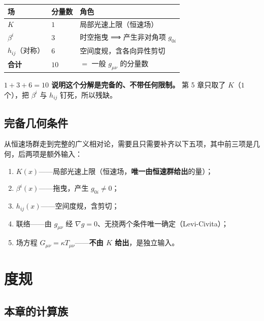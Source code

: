 \documentclass[
  chinese,
  a4paper,
  UTF8,
  12pt,
  oneside,
  openany]{ctexbook}
\newcounter{none} %
\providecommand{\tightlist}{%
  \setlength{\itemsep}{0pt}\setlength{\parskip}{0pt}}
\theoremstyle{plain}
\theoremstyle{plain}
\theoremstyle{plain}
\theoremstyle{definition}
\theoremstyle{plain}
\theoremstyle{plain}
\theoremstyle{remark}
\begin{document}
{\def\LTcaptype{none} %
\begin{longtable}[]{@{}lll@{}}
\toprule\noalign{}
场 & 分量数 & 角色 \\
\midrule\noalign{}
\endhead
\bottomrule\noalign{}
\endlastfoot
\(K\) & \(1\) & 局部光速上限（恒速场） \\
\(\beta^{i}\) & \(3\) & 时空拖曳 ⟹ 产生非对角项 \(g_{0i}\) \\
\(h_{ij}\)（对称） & \(6\) & 空间度规，含各向异性剪切 \\
\textbf{合计} & \textbf{\(10\)} & \(=\) 一般 \(g_{\mu\nu}\) 的分量数 \\
\end{longtable}
}

\textbf{\(1+3+6=10\) 说明这个分解是完备的、不带任何限制。} 第 5 章只取了
\(K\)（\(1\) 个），把 \(\beta^{i}\) 与 \(h_{ij}\) 钉死，所以残缺。

\subsection{完备几何条件}\label{ux5b8cux5907ux51e0ux4f55ux6761ux4ef6}

从恒速场群走到完整的广义相对论，需要且只需要补齐以下五项，其中前三项是几何，后两项是额外输入：

\begin{enumerate}
\def\labelenumi{\arabic{enumi}.}
\tightlist
\item
  \(K(x)\)------局部光速上限（恒速场，\textbf{唯一由恒速群给出}的量）；
\item
  \(\beta^{i}(x)\)------拖曳，产生 \(g_{0i}\neq0\)；
\item
  \(h_{ij}(x)\)------空间度规，含剪切；
\item
  联络------由 \(g_{\mu\nu}\) 经
  \(\nabla g=0\)、无挠两个条件唯一确定（Levi-Civita）；
\item
  场方程 \(G_{\mu\nu}=\kappa T_{\mu\nu}\)------\textbf{不由 \(K\)
  给出}，是独立输入。
\end{enumerate}

\section{度规}\label{sec-isg2-metric}

\subsection{本章的计算族}\label{ux672cux7ae0ux7684ux8ba1ux7b97ux65cf}
\end{document}
